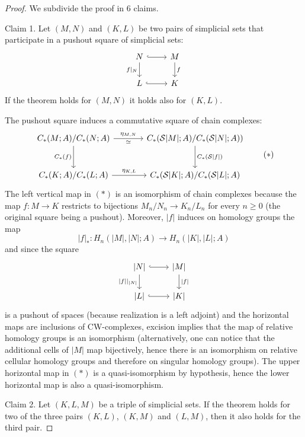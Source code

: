 \begin{proof}\renewcommand{\qedsymbol}{\textit{To be continued...}}
We subdivide the proof in $6$ claims.

Claim 1. Let $(M,N)$ and $(K,L)$ be two pairs of simplicial sets that participate in a pushout square of simplicial sets:
\[
\begin{tikzcd}
N \ar[r,hook] \ar[d,"f|_N"'] & M \ar[d,"f"]\\
L \ar[r,hook] & K
\end{tikzcd}
\]
If the theorem holds for $(M,N)$ it holds also for $(K,L)$.

\begin{claimproof}
The pushout square induces a commutative square of chain complexes:
\[
\begin{tikzcd}[row sep=large,column sep=large]
C_*(M;A)/C_*(N;A) \ar[r,"\eta_{M,N}","\simeq"'] \ar[d,"C_*(f)"'] & C_*(\S|M|;A)/C_*(\S|N|;A)) \ar[d,"C_*(\S|f|)"]\\
C_*(K;A)/C_*(L;A) \ar[r,"\eta_{K,L}"] & C_*(\S|K|;A)/C_*(\S|L|;A)
\end{tikzcd}\tag{$*$}
\]
The left vertical map in $(*)$ is an isomorphism of chain complexes because the map $f:M\to K$ restricts to bijections $M_n/N_n\to K_n/L_n$ for every $n\ge0$ (the original square being a pushout).
Moreover, $|f|$ induces on homology groups the map
\[|f|_*:H_n(|M|,|N|;A)\to H_n(|K|,|L|;A)\]
and since the square
\[
\begin{tikzcd}
{|N|} \ar[r,hook] \ar[d,"{|f|}|_{|N|}"'] & {|M|} \ar[d,"{|f|}"]\\
{|L|} \ar[r,hook] & {|K|}
\end{tikzcd}
\]
is a pushout of spaces (because realization is a left adjoint) and the horizontal maps are inclusions of CW-complexes, excision implies that the map of relative homology groups is an isomorphism (alternatively, one can notice that the additional cells of $|M|$ map bijectively, hence there is an isomorphism on relative cellular homology groups and therefore on singular homology groups). The upper horizontal map in $(*)$ is a quasi-isomorphism by hypothesis, hence the lower horizontal map is also a quasi-isomorphism.
\end{claimproof}

Claim 2. Let $(K,L,M)$ be a triple of simplicial sets. If the theorem holds for two of the three pairs $(K,L)$, $(K,M)$ and $(L,M)$, then it also holds for the third pair.


\end{proof}
